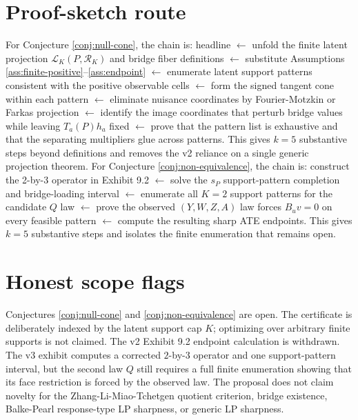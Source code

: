 \documentclass[11pt]{article}
\theoremstyle{definition}
\theoremstyle{plain}
\theoremstyle{remark}
\begin{document}
\section{Proof-sketch route}
For Conjecture \ref{conj:null-cone}, the chain is: headline \(\leftarrow\) unfold the finite latent projection \(\mathcal L_K(P,\mathcal R_K)\) and bridge fiber definitions \(\leftarrow\) substitute Assumptions \ref{ass:finite-positive}--\ref{ass:endpoint} \(\leftarrow\) enumerate latent support patterns consistent with the positive observable cells \(\leftarrow\) form the signed tangent cone within each pattern \(\leftarrow\) eliminate nuisance coordinates by Fourier-Motzkin or Farkas projection \(\leftarrow\) identify the image coordinates that perturb bridge values while leaving \(T_a(P)h_a\) fixed \(\leftarrow\) prove that the pattern list is exhaustive and that the separating multipliers glue across patterns. This gives \(k=5\) substantive steps beyond definitions and removes the v2 reliance on a single generic projection theorem. For Conjecture \ref{conj:non-equivalence}, the chain is: construct the 2-by-3 operator in Exhibit 9.2 \(\leftarrow\) solve the \(s_P\) support-pattern completion and bridge-loading interval \(\leftarrow\) enumerate all \(K=2\) support patterns for the candidate \(Q\) law \(\leftarrow\) prove the observed \((Y,W,Z,A)\) law forces \(B_uv=0\) on every feasible pattern \(\leftarrow\) compute the resulting sharp ATE endpoints. This gives \(k=5\) substantive steps and isolates the finite enumeration that remains open.

\section{Honest scope flags}
Conjectures \ref{conj:null-cone} and \ref{conj:non-equivalence} are open. The certificate is deliberately indexed by the latent support cap \(K\); optimizing over arbitrary finite supports is not claimed. The v2 Exhibit 9.2 endpoint calculation is withdrawn. The v3 exhibit computes a corrected \(2\)-by-\(3\) operator and one support-pattern interval, but the second law \(Q\) still requires a full finite enumeration showing that its face restriction is forced by the observed law. The proposal does not claim novelty for the Zhang-Li-Miao-Tchetgen quotient criterion, bridge existence, Balke-Pearl response-type LP sharpness, or generic LP sharpness.
\end{document}
